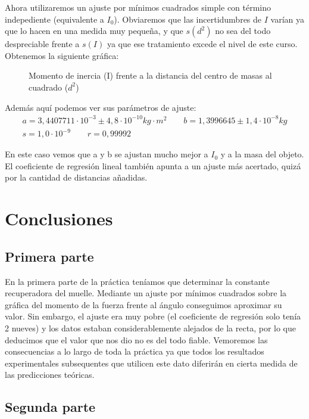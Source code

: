 \documentclass[12pt, a4paper, titlepage]{article}
\begin{document}
  Ahora utilizaremos un ajuste por mínimos cuadrados simple con término indepediente (equivalente a $I_0$). Obviaremos que las incertidumbres de $I$ varían ya que lo hacen en una medida muy pequeña, y que $s(d^2)$ no sea del todo despreciable frente a $s(I)$ ya que ese tratamiento excede el nivel de este curso. Obtenemos la siguiente gráfica:

  \begin{figure}[H]
    \hspace{3.2em} 
    \caption{Momento de inercia (I) frente a la distancia del centro de masas al cuadrado ($d^2$)}
  \end{figure}


  Además aquí podemos ver sus parámetros de ajuste:
  \begin{gather*}
    a = 3,4407711 \cdot 10^{-3} \pm 4,8 \cdot 10^{-10} kg \cdot m^2 \qquad b = 1,3996645 \pm 1,4 \cdot 10^{-8} kg \\
    s = 1,0 \cdot 10^{-9} \qquad r = 0,99992
  \end{gather*}

  En este caso vemos que a y b se ajustan mucho mejor a $I_0$ y a la masa del objeto. El coeficiente de regresión lineal también apunta a un ajuste más acertado, quizá por la cantidad de distancias añadidas.


  \newpage
  \section{Conclusiones}

  \subsection{Primera parte}

  En la primera parte de la práctica teníamos que determinar la constante recuperadora del muelle. Mediante un ajuste por mínimos cuadrados sobre la gráfica del momento de la fuerza frente al ángulo conseguimos aproximar su valor. Sin embargo, el ajuste era muy pobre (el coeficiente de regresión solo tenía 2 nueves) y los datos estaban considerablemente alejados de la recta, por lo que deducimos que el valor que nos dio no es del todo fiable. Vemoremos las consecuencias a lo largo de toda la práctica ya que todos los resultados experimentales subsequentes que utilicen este dato diferirán en cierta medida de las predicciones teóricas.

  \subsection{Segunda parte}
\end{document}
